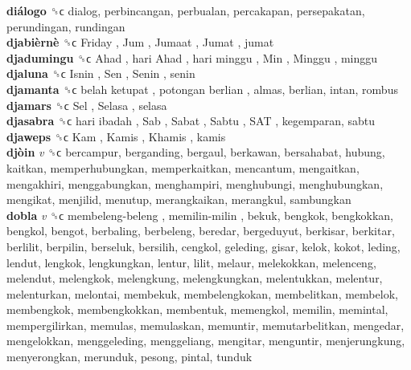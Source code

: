 \textbf{diálogo} ␝ϲ  dialog, perbincangan, perbualan, percakapan, persepakatan, perundingan, rundingan  \\
\textbf{djabièrnè} ␝ϲ   Friday ,  Jum ,  Jumaat ,  Jumat , jumat  \\
\textbf{djadumingu} ␝ϲ   Ahad ,  hari Ahad ,  hari minggu ,  Min ,  Minggu , minggu  \\
\textbf{djaluna} ␝ϲ   Isnin ,  Sen ,  Senin , senin  \\
\textbf{djamanta} ␝ϲ   belah ketupat ,  potongan berlian , almas, berlian, intan, rombus  \\
\textbf{djamars} ␝ϲ   Sel ,  Selasa , selasa  \\
\textbf{djasabra} ␝ϲ   hari ibadah ,  Sab ,  Sabat ,  Sabtu ,  SAT , kegemparan, sabtu  \\
\textbf{djaweps} ␝ϲ   Kam ,  Kamis ,  Khamis , kamis  \\
\textbf{djòin} \emph{v}  ␝ϲ  bercampur, berganding, bergaul, berkawan, bersahabat, hubung, kaitkan, memperhubungkan, memperkaitkan, mencantum, mengaitkan, mengakhiri, menggabungkan, menghampiri, menghubungi, menghubungkan, mengikat, menjilid, menutup, merangkaikan, merangkul, sambungkan  \\
\textbf{dobla} \emph{v}  ␝ϲ   membeleng-beleng ,  memilin-milin , bekuk, bengkok, bengkokkan, bengkol, bengot, berbaling, berbeleng, beredar, bergeduyut, berkisar, berkitar, berlilit, berpilin, berseluk, bersilih, cengkol, geleding, gisar, kelok, kokot, leding, lendut, lengkok, lengkungkan, lentur, lilit, melaur, melekokkan, melenceng, melendut, melengkok, melengkung, melengkungkan, melentukkan, melentur, melenturkan, melontai, membekuk, membelengkokan, membelitkan, membelok, membengkok, membengkokkan, membentuk, memengkol, memilin, memintal, mempergilirkan, memulas, memulaskan, memuntir, memutarbelitkan, mengedar, mengelokkan, menggeleding, menggeliang, mengitar, menguntir, menjerungkung, menyerongkan, merunduk, pesong, pintal, tunduk  \\
